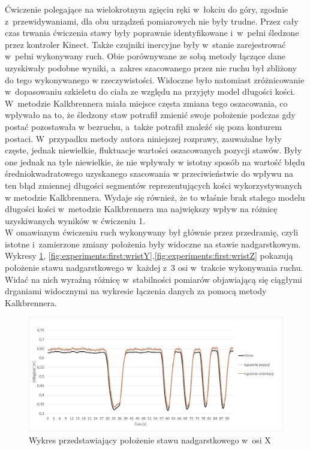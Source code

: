 Ćwiczenie polegające na wielokrotnym zgięciu ręki w~łokciu do góry, zgodnie z~przewidywaniami, dla obu urządzeń pomiarowych nie były trudne. Przez cały czas trwania ćwiczenia stawy były poprawnie identyfikowane i~w~pełni śledzone przez kontroler Kinect. Także czujniki inercyjne były w~stanie zarejestrować w~pełni  wykonywany ruch. Obie porównywane ze sobą metody łączące dane uzyskiwały podobne wyniki, a~zakres szacowanego przez nie ruchu był zbliżony do tego wykonywanego w rzeczywistości. Widoczne było natomiast zróżnicowanie w~dopasowaniu szkieletu do ciała ze względu na przyjęty model długości kości. W~metodzie Kalkbrennera miała miejsce częsta zmiana tego oszacowania, co wpływało na to, że śledzony staw potrafił zmienić swoje położenie podczas gdy postać pozostawała w bezruchu, a~także potrafił znaleźć się poza konturem postaci. W~przypadku metody autora niniejszej rozprawy, zauważalne były częste, jednak niewielkie, fluktuacje wartości oszacowanych pozycji stawów. Były one jednak na tyle niewielkie, że nie wpływały w istotny sposób na wartość błędu średniokwadratowego uzyskanego szacowania w przeciwieństwie do wpływu na ten błąd zmiennej długości segmentów reprezentujących kości wykorzystywanych w metodzie Kalkbrennera. Wydaje się również, że to właśnie brak stałego modelu długości kości w~metodzie Kalkbrennera ma największy wpływ na różnicę uzyskiwanych wyników w ćwiczeniu 1. \\
						
W omawianym ćwiczeniu ruch wykonywany był głównie przez przedramię, czyli istotne i~zamierzone zmiany położenia były widoczne na stawie nadgarstkowym. Wykresy \ref{fig:experiments:first:wristX}, \ref{fig:experiments:first:wristY},\ref{fig:experiments:first:wristZ} pokazują położenie stawu nadgarstkowego w~każdej z~3 osi w~trakcie wykonywania ruchu. Widać na nich wyraźną różnicę w~stabilności pomiarów objawiającą się ciągłymi drganiami widocznymi na wykresie łączenia danych za pomocą metody Kalkbrennera.
						
\begin{savenotes}
	\begin{figure}[hbp]
		\centering
		\includegraphics[width=0.9\linewidth]{images/100/Slide4.png}
		\caption{Wykres przedstawiający położenie stawu nadgarstkowego w~osi X}
		\label{fig:experiments:first:wristX}
	\end{figure}
\end{savenotes}
								
